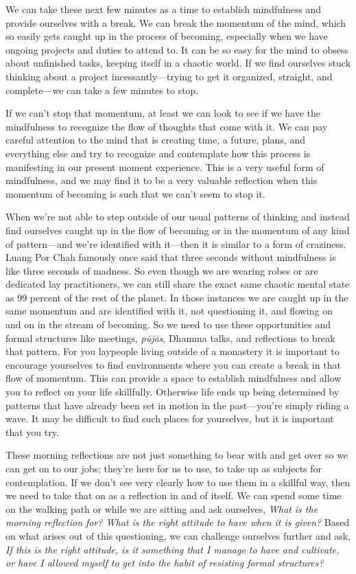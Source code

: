 
We can take these next few minutes as a time to establish mindfulness 
and provide ourselves with a break. We can break the momentum of the 
mind, which so easily gets caught up in the process of becoming, 
especially when we have ongoing projects and duties to attend to. It 
can be so easy for the mind to obsess about unfinished tasks, keeping 
itself in a chaotic world. If we find ourselves stuck thinking about a 
project incessantly---trying to get it organized, straight, and 
complete---we can take a few minutes to stop.

If we can't stop that momentum, at least we can look to see if we have 
the mindfulness to recognize the flow of thoughts that come with it. We 
can pay careful attention to the mind that is creating time, a future, 
plans, and everything else and try to recognize and contemplate how 
this process is manifesting in our present moment experience. This is a 
very useful form of mindfulness, and we may find it to be a very 
valuable reflection when this momentum of becoming is such that we 
can't seem to stop it.

When we're not able to step outside of our usual patterns of thinking 
and instead find ourselves caught up in the flow of becoming or in the 
momentum of any kind of pattern---and we're identified with it---then 
it is similar to a form of craziness. Luang Por Chah famously once said 
that three seconds without mindfulness is like three seconds of 
madness. So even though we are wearing robes or are dedicated lay 
practitioners, we can still share the exact same chaotic mental state 
as 99 percent of the rest of the planet. In those instances we are 
caught up in the same momentum and are identified with it, not 
questioning it, and flowing on and on in the stream of becoming. So we 
need to use these opportunities and formal structures like meetings, 
\emph{pūjās}, Dhamma talks, and reflections to break that pattern. 
For you laypeople living outside of a monastery it is important to 
encourage yourselves to find environments where you can create a break 
in that flow of momentum. This can provide a space to establish 
mindfulness and allow you to reflect on your life skillfully. Otherwise 
life ends up being determined by patterns that have already been set in 
motion in the past---you're simply riding a wave. It may be difficult 
to find such places for yourselves, but it is important that you try.

These morning reflections are not just something to bear with and get 
over so we can get on to our jobs; they're here for us to use, to take 
up as subjects for contemplation. If we don't see very clearly how to 
use them in a skillful way, then we need to take that on as a 
reflection in and of itself. We can spend some time on the walking path 
or while we are sitting and ask ourselves, \emph{What is the morning 
reflection for? What is the right attitude to have when it is given?} 
Based on what arises out of this questioning, we can challenge 
ourselves further and ask, \emph{If this is the right attitude, is it 
something that I manage to have and cultivate, or have I allowed myself 
to get into the habit of resisting formal structures?}

